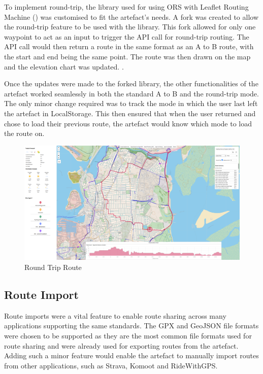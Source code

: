 To implement round-trip, the library used for using ORS with Leaflet Routing Machine (\cite{noauthor_gegewebleaflet-routing-machine-openroute_2020}) was customised to fit the artefact's needs. A fork was created to allow the round-trip feature to be used with the library. This fork allowed for only one waypoint to act as an input to trigger the API call for round-trip routing. The API call would then return a route in the same format as an A to B route, with the start and end being the same point. The route was then drawn on the map and the elevation chart was updated. .

Once the updates were made to the forked library, the other functionalities of the artefact worked seamlessly in both the standard A to B and the round-trip mode. The only minor change required was to track the mode in which the user last left the artefact in LocalStorage. This then ensured that when the user returned and chose to load their previous route, the artefact would know which mode to load the route on.

\begin{figure}[!ht]
  \centering
  \includegraphics[width=425px]{figures/Progress Images/Iteration-3/SR11/SR11- Round Trip functionality working.png}
  \caption{Round Trip Route}
  \label{fig:round-trip}
\end{figure}

\subsection{Route Import}
\label{iteration3:route-import}

Route imports were a vital feature to enable route sharing across many applications supporting the same standards. The GPX and GeoJSON file formats were chosen to be supported as they are the most common file formats used for route sharing and were already used for exporting routes from the artefact. Adding such a minor feature would enable the artefact to manually import routes from other applications, such as Strava, Komoot and RideWithGPS.

